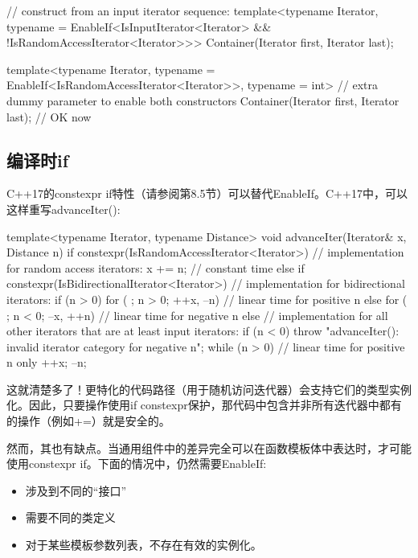 \begin{cpp}
// construct from an input iterator sequence:
template<typename Iterator,
		typename = EnableIf<IsInputIterator<Iterator> &&
							!IsRandomAccessIterator<Iterator>>>
Container(Iterator first, Iterator last);

template<typename Iterator,
		typename = EnableIf<IsRandomAccessIterator<Iterator>>,
		typename = int> // extra dummy parameter to enable both constructors
Container(Iterator first, Iterator last); // OK now
\end{cpp}

\subsection{编译时if}

C++17的constexpr if特性（请参阅第8.5节）可以替代EnableIf。C++17中，可以这样重写advanceIter():

\begin{cpp}
template<typename Iterator, typename Distance>
void advanceIter(Iterator& x, Distance n) {
	if constexpr(IsRandomAccessIterator<Iterator>) {
		// implementation for random access iterators:
		x += n; // constant time
	}
	else if constexpr(IsBidirectionalIterator<Iterator>) {
		// implementation for bidirectional iterators:
		if (n > 0) {
			for ( ; n > 0; ++x, --n) { // linear time for positive n
			}
		} else {
			for ( ; n < 0; --x, ++n) { // linear time for negative n
			}
		}
	}
	else {
		// implementation for all other iterators that are at least input iterators:
		if (n < 0) {
			throw "advanceIter(): invalid iterator category for negative n";
		}
		while (n > 0) { // linear time for positive n only
			++x;
			--n;
		}
	}
}
\end{cpp}

这就清楚多了！更特化的代码路径（用于随机访问迭代器）会支持它们的类型实例化。因此，只要操作使用if constexpr保护，那代码中包含并非所有迭代器中都有的操作（例如+=）就是安全的。

然而，其也有缺点。当通用组件中的差异完全可以在函数模板体中表达时，才可能使用constexpr if。下面的情况中，仍然需要EnableIf:

\begin{itemize}
\item
涉及到不同的“接口”

\item
需要不同的类定义

\item
对于某些模板参数列表，不存在有效的实例化。
\end{itemize}


